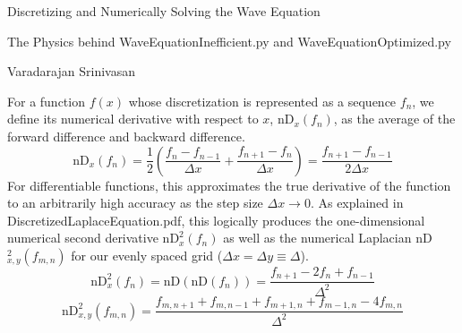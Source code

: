 \documentclass{article}
\begin{document}
\flushleft
{\large Discretizing and Numerically Solving the Wave Equation}

The Physics behind WaveEquationInefficient.py and WaveEquationOptimized.py

\smallskip
Varadarajan Srinivasan
\bigskip


For a function $f(x)$ whose discretization is represented as a sequence $f_n$, we define its numerical derivative with respect to $x$, nD$_x(f_n)$, as the average of the forward difference and backward difference.
\begin{equation} \label{1st deriv 1d}
\mbox{nD}_x(f_n)=\frac{1}{2}\left(\frac{f_{n}-f_{n-1}}{\Delta x}+\frac{f_{n+1}-f_n}{\Delta x}\right)=\frac{f_{n+1}-f_{n-1}}{2\Delta x}
\end{equation}
For differentiable functions, this approximates the true derivative of the function to an arbitrarily high accuracy as the step size $\Delta x \rightarrow 0$. As explained in DiscretizedLaplaceEquation.pdf, this logically produces the one-dimensional numerical second derivative $\mbox{nD}_x^2(f_n)$ as well as the numerical Laplacian nD$_{x,y}^2(f_{m,n})$ for our evenly spaced grid ($\Delta x = \Delta y \equiv \Delta$).
\begin{equation} \label{2nd deriv 1d}
\mbox{nD}_x^2(f_n)=\mbox{nD}(\mbox{nD}(f_n))=\frac{f_{n+1}-2f_{n}+f_{n-1}}{\Delta^2}
\end{equation}
\begin{equation} \label{Laplacian}
\mbox{nD}_{x,y}^2(f_{m,n})=\frac{f_{m,n+1}+f_{m,n-1}+f_{m+1,n}+f_{m-1,n}-4f_{m,n}}{\Delta^2}
\end{equation}

\bigskip
\end{document}
